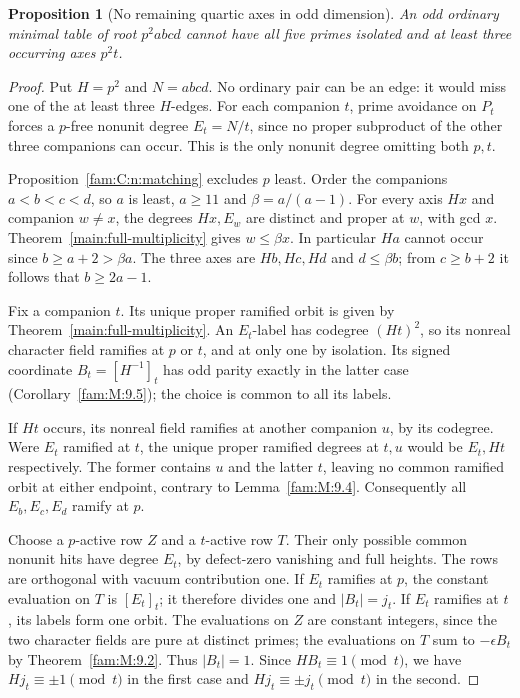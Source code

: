 \documentclass[11pt,a4paper]{article}
\numberwithin{equation}{section}
\newtheorem{proposition}[theorem]{Proposition}
\theoremstyle{remark}
\begin{document}
\begin{proposition}[No remaining quartic axes in odd dimension]\label{fam:C:3.3}
An odd ordinary minimal table of root $p^2abcd$ cannot have all
five primes isolated and at least three occurring axes $p^2t$.
\end{proposition}
\begin{proof}
Put $H=p^2$ and $N=abcd$. No ordinary pair can be an edge: it
would miss one of the at least three $H$-edges. For each companion
$t$, prime avoidance on $P_t$ forces a $p$-free nonunit degree
$E_t=N/t$, since no proper subproduct of the other three companions
can occur. This is the only nonunit degree omitting both $p,t$.

Proposition~\ref{fam:C:n:matching} excludes $p$ least. Order the
companions $a<b<c<d$, so $a$ is least, $a\ge11$ and
$\beta=a/(a-1)$. For every axis $Hx$ and companion $w\ne x$,
the degrees $Hx,E_w$ are distinct and proper at $w$, with gcd $x$.
Theorem~\ref{main:full-multiplicity} gives $w\le\beta x$.
In particular $Ha$ cannot occur since $b\ge a+2>\beta a$.
The three axes are $Hb,Hc,Hd$ and $d\le\beta b$; from $c\ge b+2$
it follows that $b\ge2a-1$.

Fix a companion $t$. Its unique proper ramified orbit is given by
Theorem~\ref{main:full-multiplicity}. An $E_t$-label has codegree
$(Ht)^2$, so its nonreal character field ramifies at $p$ or $t$,
and at only one by isolation. Its signed coordinate
$B_t=[H^{-1}]_t$ has odd parity exactly in the latter case
(Corollary~\ref{fam:M:9.5}); the choice is common to all its labels.

If $Ht$ occurs, its nonreal field ramifies at another companion $u$,
by its codegree. Were $E_t$ ramified at $t$, the unique proper
ramified degrees at $t,u$ would be $E_t,Ht$ respectively. The former
contains $u$ and the latter $t$, leaving no common ramified orbit at
either endpoint, contrary to Lemma~\ref{fam:M:9.4}. Consequently
all $E_b,E_c,E_d$ ramify at $p$.

Choose a $p$-active row $Z$ and a $t$-active row $T$. Their only
possible common nonunit hits have degree $E_t$, by defect-zero
vanishing and full heights. The rows are orthogonal with vacuum
contribution one. If $E_t$ ramifies at $p$, the constant evaluation
on $T$ is $[E_t]_t$; it therefore divides one and $|B_t|=j_t$.
If $E_t$ ramifies at $t$, its labels form one orbit. The evaluations
on $Z$ are constant integers, since the two character fields are
pure at distinct primes; the evaluations on $T$ sum to
$-\epsilon B_t$ by Theorem~\ref{fam:M:9.2}. Thus $|B_t|=1$.
Since $HB_t\equiv1\pmod t$, we have $Hj_t\equiv\pm1\pmod t$
in the first case and $Hj_t\equiv\pm j_t\pmod t$ in the second.


\end{proof}
\end{document}
